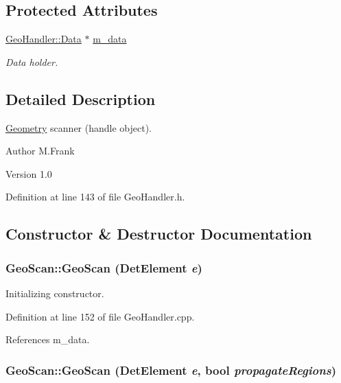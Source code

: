 \subsection*{Protected Attributes}
\begin{DoxyCompactItemize}
\item 
\hyperlink{class_d_d4hep_1_1_geometry_1_1_geo_handler_types_a568935b7e878d3ea9fe97a2ecf33d641}{GeoHandler::Data} $\ast$ \hyperlink{class_d_d4hep_1_1_geometry_1_1_geo_scan_a03dadf49cd85c4b8702872ee8df66fc1}{m\_\-data}
\begin{DoxyCompactList}\small\item\em Data holder. \item\end{DoxyCompactList}\end{DoxyCompactItemize}


\subsection{Detailed Description}
\hyperlink{namespace_d_d4hep_1_1_geometry}{Geometry} scanner (handle object). \begin{DoxyAuthor}{Author}
M.Frank 
\end{DoxyAuthor}
\begin{DoxyVersion}{Version}
1.0 
\end{DoxyVersion}


Definition at line 143 of file GeoHandler.h.

\subsection{Constructor \& Destructor Documentation}
\hypertarget{class_d_d4hep_1_1_geometry_1_1_geo_scan_a71d89e508d1251d7a2488ef3da92cf55}{
\subsubsection[{GeoScan}]{\setlength{\rightskip}{0pt plus 5cm}GeoScan::GeoScan ({\bf DetElement} {\em e})}}
\label{class_d_d4hep_1_1_geometry_1_1_geo_scan_a71d89e508d1251d7a2488ef3da92cf55}


Initializing constructor. 

Definition at line 152 of file GeoHandler.cpp.

References m\_\-data.\hypertarget{class_d_d4hep_1_1_geometry_1_1_geo_scan_a0bc62c86bafdf3a832f6f81a8fb68bd7}{
\subsubsection[{GeoScan}]{\setlength{\rightskip}{0pt plus 5cm}GeoScan::GeoScan ({\bf DetElement} {\em e}, \/  bool {\em propagateRegions})}}
\label{class_d_d4hep_1_1_geometry_1_1_geo_scan_a0bc62c86bafdf3a832f6f81a8fb68bd7}


